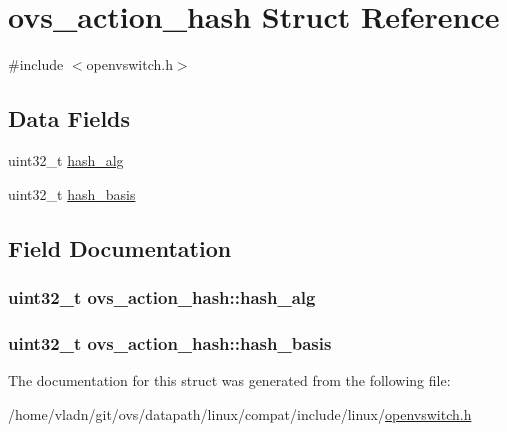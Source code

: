 \hypertarget{structovs__action__hash}{}\section{ovs\+\_\+action\+\_\+hash Struct Reference}
\label{structovs__action__hash}


{\ttfamily \#include $<$openvswitch.\+h$>$}

\subsection*{Data Fields}
\begin{DoxyCompactItemize}
\item 
uint32\+\_\+t \hyperlink{structovs__action__hash_a8dde1557790d7fc7c2cae50f4e6d65e8}{hash\+\_\+alg}
\item 
uint32\+\_\+t \hyperlink{structovs__action__hash_a174855fe08c609dd3542de6e9e8a92ee}{hash\+\_\+basis}
\end{DoxyCompactItemize}


\subsection{Field Documentation}
\hypertarget{structovs__action__hash_a8dde1557790d7fc7c2cae50f4e6d65e8}{}
\subsubsection[{hash\+\_\+alg}]{\setlength{\rightskip}{0pt plus 5cm}uint32\+\_\+t ovs\+\_\+action\+\_\+hash\+::hash\+\_\+alg}\label{structovs__action__hash_a8dde1557790d7fc7c2cae50f4e6d65e8}
\hypertarget{structovs__action__hash_a174855fe08c609dd3542de6e9e8a92ee}{}
\subsubsection[{hash\+\_\+basis}]{\setlength{\rightskip}{0pt plus 5cm}uint32\+\_\+t ovs\+\_\+action\+\_\+hash\+::hash\+\_\+basis}\label{structovs__action__hash_a174855fe08c609dd3542de6e9e8a92ee}


The documentation for this struct was generated from the following file\+:\begin{DoxyCompactItemize}
\item 
/home/vladn/git/ovs/datapath/linux/compat/include/linux/\hyperlink{openvswitch_8h}{openvswitch.\+h}\end{DoxyCompactItemize}
